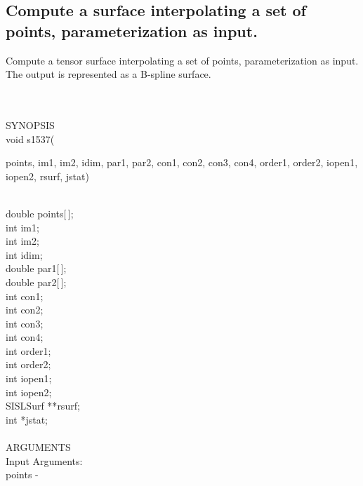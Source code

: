 \subsection{Compute a surface interpolating a set of points,
parameterization as input.}
\begin{minipg1}
  Compute a tensor surface interpolating a set of points,
  parameterization as input.
  The output is represented as a B-spline surface.
\end{minipg1} \\ \\
SYNOPSIS\\
        \>void s1537(\begin{minipg3}
          {\fov points}, {\fov im1}, {\fov im2}, {\fov idim}, {\fov par1},  {\fov par2}, {\fov con1}, {\fov con2}, {\fov con3},
          {\fov con4}, {\fov order1},  {\fov order2}, {\fov iopen1},
          {\fov iopen2}, {\fov rsurf}, {\fov jstat})
        \end{minipg3}\\[0.3ex]
        \>\>    double \> {\fov points}[\,];\\
        \>\>    int    \> {\fov im1};\\
        \>\>    int    \> {\fov im2};\\
        \>\>    int    \> {\fov idim};\\
        \>\>    double \> {\fov par1}[\,];\\
        \>\>    double \> {\fov par2}[\,];\\
        \>\>    int    \> {\fov con1};\\
        \>\>    int    \> {\fov con2};\\
        \>\>    int    \> {\fov con3};\\
        \>\>    int    \> {\fov con4};\\
        \>\>    int    \> {\fov order1};\\
        \>\>    int    \> {\fov order2};\\
        \>\>    int    \> {\fov iopen1};\\
        \>\>    int    \> {\fov iopen2};\\
        \>\>    SISLSurf \> **{\fov rsurf};\\
        \>\>    int    \> *{\fov jstat};\\
\\
ARGUMENTS\\
        \>Input Arguments:\\
        \>\>    {\fov points}\> - \>
